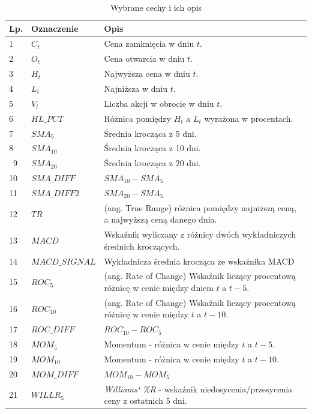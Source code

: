 \documentclass[a4paper, twoside, 11pt, openright]{article}
\begin{document}
\begin{longtable}[c]{| m{0.5cm} m{5cm} m{10cm}|} 

\toprule
  Lp. & Oznaczenie & Opis\\
\midrule
\endhead
\midrule

\caption{Wybrane cechy i ich opis}
\label{data_columns_table}
\endfoot

\bottomrule
\caption{Wybrane cechy i ich opis}
\label{data_columns_table}
\endlastfoot


 1 & $C_t$ & Cena zamknięcia w dniu $t$. \\ 
 2 & $O_t$ & Cena otwarcia w dniu $t$. \\
 3 & $H_t$ & Najwyższa cena w dniu $t$. \\
 4 & $L_t$ & Najniższa w dniu $t$. \\
 5 & $V_t$ & Liczba akcji w obrocie w dniu $t$. \\
 6 & $HL\_PCT$ & Różnica pomiędzy $H_t$ a $L_t$ wyrażona w procentach.\\
 7 & $SMA_5$ & Średnia krocząca z 5 dni. \\
 8 & $SMA_{10}$ & Średnia krocząca z 10 dni. \\\
  9 & $SMA_{20}$ & Średnia krocząca z 20 dni. \\
 10 & $SMA\_DIFF$ & $SMA_{10}-SMA_{5}$ \\
 11 & $SMA\_DIFF2$ & $SMA_{20}-SMA_{5}$ \\
 12 & $TR$ & (ang. True Range) różnica pomiędzy najniższą ceną, a najwyższą ceną danego dnia. \\
 13 & $MACD$ & Wskaźnik wyliczany z różnicy dwóch wykładniczych średnich kroczących.\\
 14 & $MACD\_SIGNAL$ & Wykładnicza średnia krocząca ze wskaźnika MACD \\
 15 & $ROC_{5}$ & (ang. Rate of Change) Wskaźnik liczący procentową różnicę w cenie między dniem $t$ a $t-5$. \\
 16 & $ROC_{10}$ & (ang. Rate of Change) Wskaźnik liczący procentową różnicę w cenie między $t$ a $t-10$. \\
 17 & $ROC\_DIFF$ & $ROC_{10}-ROC_{5}$ \\
  18 & $MOM_{5}$ & Momentum - różnica w cenie między $t$ a $t-5$.  \\
 19 & $MOM_{10}$ & Momentum - różnica w cenie między $t$ a $t-10$. \\
 20 & $MOM\_DIFF$ & $MOM_{10}-MOM_{5}$ \\
  21 & $WILLR_{5}$ & \textit{Williams` \%R} - wskaźnik niedosycenia/przesycenia ceny z ostatnich 5 dni. \\

\end{longtable}
\end{document}
